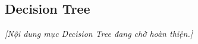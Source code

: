 
\subsection{Decision Tree}\label{subsubsec:decision-tree}

\textit{[Nội dung mục Decision Tree đang chờ hoàn thiện.]}
